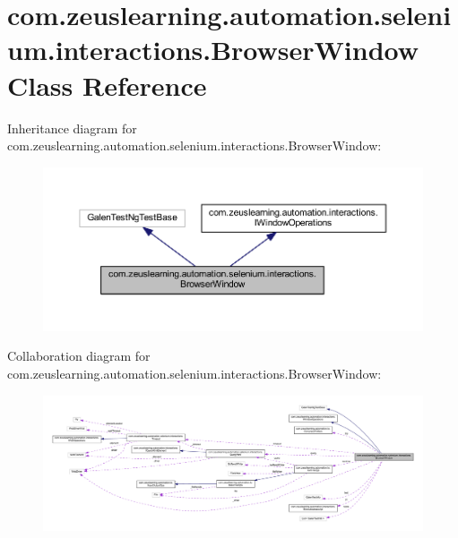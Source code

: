 \hypertarget{classcom_1_1zeuslearning_1_1automation_1_1selenium_1_1interactions_1_1BrowserWindow}{}\section{com.\+zeuslearning.\+automation.\+selenium.\+interactions.\+Browser\+Window Class Reference}
\label{classcom_1_1zeuslearning_1_1automation_1_1selenium_1_1interactions_1_1BrowserWindow}


Inheritance diagram for com.\+zeuslearning.\+automation.\+selenium.\+interactions.\+Browser\+Window\+:
\nopagebreak
\begin{figure}[H]
\begin{center}
\leavevmode
\includegraphics[width=350pt]{d6/d01/classcom_1_1zeuslearning_1_1automation_1_1selenium_1_1interactions_1_1BrowserWindow__inherit__graph}
\end{center}
\end{figure}


Collaboration diagram for com.\+zeuslearning.\+automation.\+selenium.\+interactions.\+Browser\+Window\+:
\nopagebreak
\begin{figure}[H]
\begin{center}
\leavevmode
\includegraphics[width=350pt]{d5/dce/classcom_1_1zeuslearning_1_1automation_1_1selenium_1_1interactions_1_1BrowserWindow__coll__graph}
\end{center}
\end{figure}
